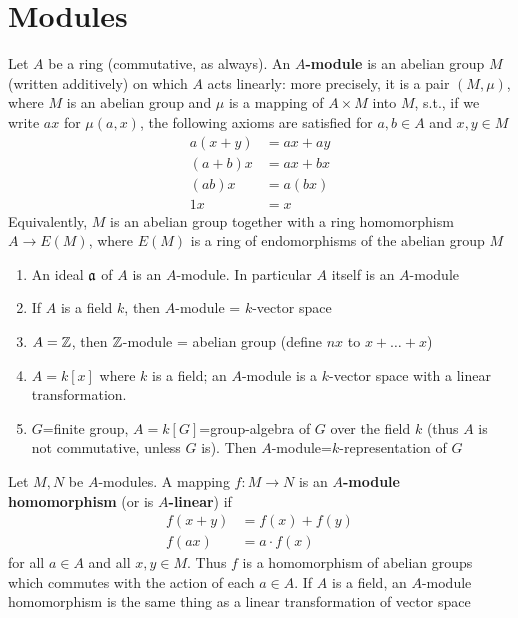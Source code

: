 \documentclass[11pt]{article}
\begin{document}
\section{Modules}
\label{sec:org2b08234}
Let \(A\) be a ring (commutative, as always). An \textbf{\(A\)-module} is an abelian group \(M\) (written
additively) on which \(A\) acts linearly: more precisely, it is a pair \((M,\mu)\), where \(M\) is
an abelian group and \(\mu\) is a mapping of \(A\times M\) into \(M\), s.t., if we write \(ax\)
for \(\mu(a,x)\), the following axioms are satisfied for \(a,b\in A\) and \(x,y\in M\)
\begin{align*}
a(x+y)&=ax+ay\\
(a+b)x&=ax+bx\\
(ab)x&=a(bx)\\
1x&=x
\end{align*}
Equivalently, \(M\) is an abelian group together with a ring homomorphism \(A\to E(M)\),
where \(E(M)\) is a ring of endomorphisms of the abelian group \(M\)

\begin{examplle}[]
\begin{enumerate}
\item An ideal \(\mathfrak{a}\) of \(A\) is an \(A\)-module. In particular \(A\) itself is an \(A\)-module
\item If \(A\) is a field \(k\), then \(A\)-module = \(k\)-vector space
\item \(A=\mathbb{Z}\), then \(\mathbb{Z}\)-module = abelian group (define \(nx\) to \(x+\dots+x\))
\item \(A=k[x]\) where \(k\) is a field; an \(A\)-module is a \(k\)-vector space with a linear transformation.
\item \(G\)=finite group, \(A=k[G]\)=group-algebra of \(G\) over the field \(k\) (thus \(A\) is not
commutative, unless \(G\) is). Then \(A\)-module=\(k\)-representation of \(G\)
\end{enumerate}
\end{examplle}

Let \(M,N\) be \(A\)-modules. A mapping \(f:M\to N\) is an \textbf{\(A\)-module homomorphism} (or is
\textbf{\(A\)-linear}) if
\begin{align*}
f(x+y)&=f(x)+f(y)\\
f(ax)&=a\cdot f(x)
\end{align*}
for all \(a\in A\) and all \(x,y\in M\). Thus \(f\) is a homomorphism of abelian groups which
commutes with the action of each \(a\in A\). If \(A\) is a field, an \(A\)-module homomorphism is
the same thing as a linear transformation of vector space
\end{document}
